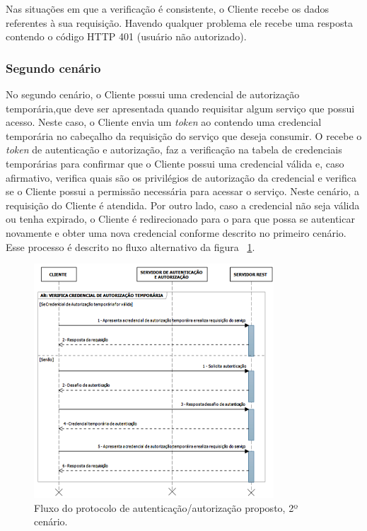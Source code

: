Nas situações em que a verificação é consistente, o Cliente recebe os dados referentes à sua requisição.
Havendo qualquer problema ele recebe uma resposta contendo o código HTTP 401 (usuário não autorizado).


\subsubsection{Segundo cenário}

No segundo cenário, o Cliente possui uma credencial de autorização temporária,que deve ser apresentada quando requisitar algum serviço que possui acesso.
Neste caso, o Cliente envia um \emph{token} ao \servidorRest{} contendo uma credencial temporária no cabeçalho da requisição do serviço que deseja consumir. O \servidorRest{} recebe o \emph{token} de autenticação e autorização, faz a verificação na tabela de credenciais temporárias para confirmar que o Cliente possui uma credencial válida e, caso afirmativo, verifica quais são os privilégios de autorização da credencial e verifica se o Cliente possui a permissão necessária para acessar o serviço. Neste cenário, a requisição do Cliente é atendida. Por outro lado, caso a credencial não seja válida ou tenha expirado, o Cliente é redirecionado para o \servidorAA{} para que possa se autenticar novamente e obter uma nova credencial conforme descrito no primeiro cenário. Esse processo é descrito no fluxo alternativo da figura ~\ref{fig:cenario2}.

\begin{figure}[!htb]
    \centering
     \includegraphics[width=0.8\textwidth]{cenario2_autenticacao.png}
     \caption{Fluxo do protocolo de autenticação/autorização proposto, 2º cenário.}
     \label{fig:cenario2}
\end{figure}


